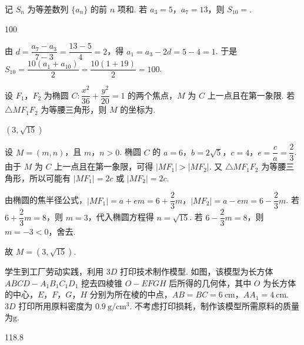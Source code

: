 \begin{problem}
记 \(S_n\) 为等差数列 \(\{a_n\}\) 的前 \(n\) 项和. 若 \(a_3=5\)，\(a_7=13\)，则 \(S_{10}=\)\fillinblank{}.
\end{problem}

\begin{answer}
100
\end{answer}

\begin{solution}
由 \(d=\dfrac{a_7-a_3}{7-3}=\dfrac{13-5}{4}=2\)，得 \(a_1=a_3-2d=5-4=1\). 于是 \(S_{10}=\dfrac{10(a_1+a_{10})}{2}=\dfrac{10(1+19)}{2}=100\).
\end{solution}

\begin{problem}
设 \(F_1\)，\(F_2\) 为椭圆 \(C:\dfrac{x^2}{36}+\dfrac{y^2}{20}=1\) 的两个焦点，\(M\) 为 \(C\) 上一点且在第一象限. 若 \(\triangle MF_1F_2\) 为等腰三角形，则 \(M\) 的坐标为\fillinblank{}.
\end{problem}

\begin{answer}
\((3,\sqrt{15})\)
\end{answer}

\begin{solution}
设 \(M=(m,n)\)，且 \(m\)，\(n>0\). 椭圆 \(C\) 的 \(a=6\)，\(b=2\sqrt5\)，\(c=4\)，\(e=\dfrac ca=\dfrac23\). 由于 \(M\) 为 \(C\) 上一点且在第一象限，可得 \(|MF_1|>|MF_2|\). 又 \(\triangle MF_1F_2\) 为等腰三角形，所以可能有 \(|MF_1|=2c\) 或 \(|MF_2|=2c\).

由椭圆的焦半径公式，\(|MF_1|=a+em=6+\dfrac23 m\)，\(|MF_2|=a-em=6-\dfrac23 m\). 若 \(6+\dfrac23 m=8\)，则 \(m=3\)，代入椭圆方程得 \(n=\sqrt{15}\). 若 \(6-\dfrac23 m=8\)，则 \(m=-3<0\)，舍去.

故 \(M=(3,\sqrt{15})\).
\end{solution}

\begin{problem}
学生到工厂劳动实践，利用 \(3D\) 打印技术制作模型. 如图，该模型为长方体 \(ABCD-A_1B_1C_1D_1\) 挖去四棱锥 \(O-EFGH\) 后所得的几何体，其中 \(O\) 为长方体的中心，\(E\)，\(F\)，\(G\)，\(H\) 分别为所在棱的中点，\(AB=BC=6\mathrm{~cm}\)，\(AA_1=4\mathrm{~cm}\). \(3D\) 打印所用原料密度为 \(0.9\mathrm{~g/cm^3}\). 不考虑打印损耗，制作该模型所需原料的质量为\fillinblank{}\(\mathrm{g}\).

\end{problem}

\begin{answer}
118.8
\end{answer}


